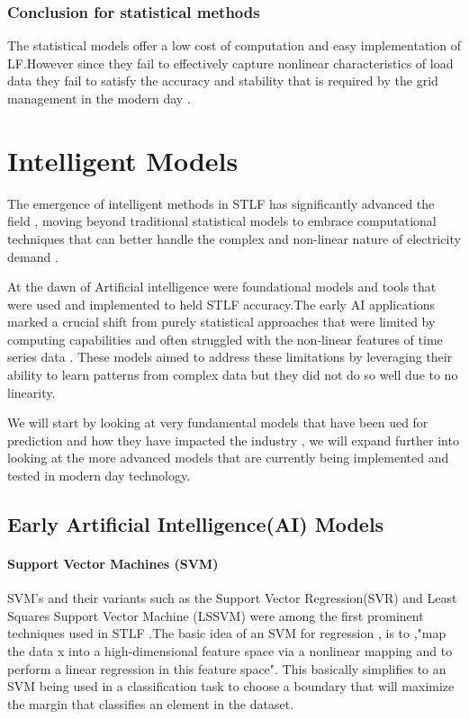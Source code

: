  
 \subsubsection{Conclusion for statistical methods} 
 The statistical models offer a low cost of computation and easy implementation of LF.However since they fail to effectively capture nonlinear characteristics of load data they fail to satisfy the accuracy and stability that is required by the grid management in the modern day \cite{li2023short}.
 \newpage
 

 \section{Intelligent Models}
 The emergence of intelligent methods in STLF has significantly advanced the field  , moving beyond traditional statistical models to embrace computational techniques that can better handle the complex and non-linear nature of electricity demand \cite{arvanitidis2021enhanced}.
 
 At the dawn of Artificial intelligence were foundational models and tools that were used and implemented to held STLF accuracy.The early AI applications marked a crucial shift from purely statistical approaches that were limited by computing capabilities and often struggled with the non-linear features of time series data \cite{wang2018short}. These models aimed to address these limitations by leveraging their ability to learn patterns from complex data but they did not do so well due to no linearity.
 
 We will start by looking at very fundamental models that have been ued for prediction and how they have impacted the industry  , we will expand further into looking at the more advanced models that are currently being implemented and tested in modern day technology.
 
 \subsection{Early Artificial Intelligence(AI) Models}
 
 \paragraph{Support Vector Machines (SVM)}

 SVM's  and their variants such as the Support Vector Regression(SVR) and Least Squares Support Vector Machine (LSSVM) were among the first prominent techniques used in STLF \cite{wang2018short}.The basic idea of an SVM for regression , is to ,"map the data x into a high-dimensional feature space via a nonlinear
 mapping and to perform a linear regression in this feature space"\cite{mohandes2002support}. This basically simplifies to an SVM being used in a classification task to choose a boundary that will maximize the margin that classifies an element in the dataset.
 
